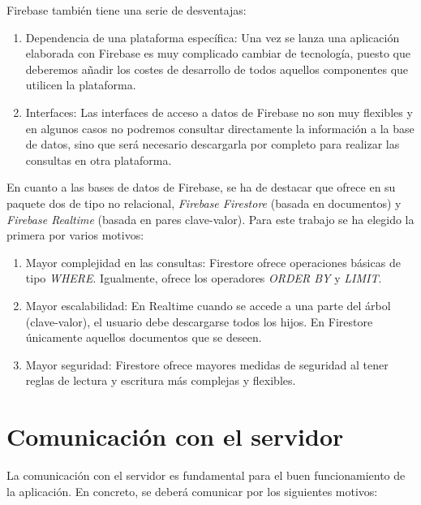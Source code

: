 \documentclass[twoside]{report}
\begin{document}
Firebase también tiene una serie de desventajas:

\begin{enumerate}
\item Dependencia de una plataforma específica: Una vez se lanza una aplicación elaborada con Firebase es muy complicado cambiar de tecnología, puesto que deberemos añadir los costes de desarrollo de todos aquellos componentes que utilicen la plataforma.

\item Interfaces: Las interfaces de acceso a datos de Firebase no son muy flexibles y en algunos casos no podremos consultar directamente la información a la base de datos, sino que será necesario descargarla por completo para realizar las consultas en otra plataforma.

\end{enumerate}

En cuanto a las bases de datos de Firebase, se ha de destacar que ofrece en su paquete dos de tipo no relacional, \textit{Firebase Firestore} (basada en documentos) y \textit{Firebase Realtime} (basada en pares clave-valor). Para este trabajo se ha elegido la primera por varios motivos:

\begin{enumerate}
\item Mayor complejidad en las consultas: Firestore ofrece operaciones básicas de tipo \textit{WHERE}. Igualmente, ofrece los operadores \textit{ORDER BY} y \textit{LIMIT}.
\item Mayor escalabilidad: En Realtime cuando se accede a una parte del árbol (clave-valor), el usuario debe descargarse todos los hijos. En Firestore únicamente aquellos documentos que se deseen.
\item Mayor seguridad: Firestore ofrece mayores medidas de seguridad al tener reglas de lectura y escritura más complejas y flexibles.
\end{enumerate}

\section{Comunicación con el servidor}
La comunicación con el servidor es fundamental para el buen funcionamiento de la aplicación. En concreto, se deberá comunicar por los siguientes motivos:
\end{document}
